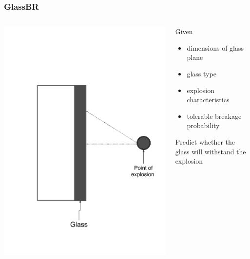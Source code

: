 \documentclass[usenames]{beamer}
\begin{document}
\begin{frame}

\frametitle{GlassBR}

\begin{columns}
\begin{column}{0.5\textwidth}
\includegraphics[width=1.0\textwidth]{../figures/physicalsystimage.png}
\end{column}
\begin{column}{0.5\textwidth}
Given

\begin{itemize}
\item dimensions of glass plane
\item glass type
\item explosion characteristics
\item tolerable breakage probability
\end{itemize}

Predict whether the glass will withstand the explosion

\end{column}
\end{columns}

\end{frame}
\end{document}
